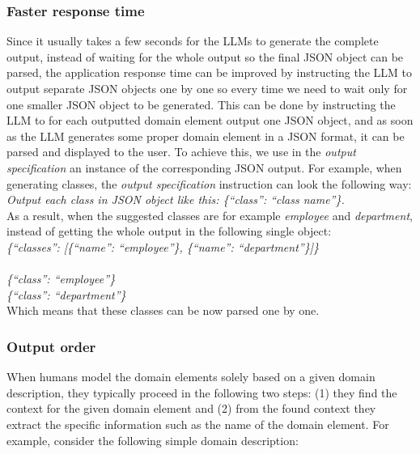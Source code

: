 \subsubsection{Faster response time}

Since it usually takes a few seconds for the LLMs to generate the complete output, instead of waiting for the whole output so the final JSON object can be parsed, the application response time can be improved by instructing the LLM to output separate JSON objects one by one so every time we need to wait only for one smaller JSON object to be generated. This can be done by instructing the LLM to for each outputted domain element output one JSON object, and as soon as the LLM generates some proper domain element in a JSON format, it can be parsed and displayed to the user. To achieve this, we use in the \emph{output specification} an instance of the corresponding JSON output. For example, when generating classes, the \emph{output specification} instruction can look the following way: \\

\noindent{}\textit{Output each class in JSON object like this: \{``class'': ``class name''\}.} \\

\noindent{}As a result, when the suggested classes are for example \textit{employee} and \textit{department}, instead of getting the whole output in the following single object: \\

\noindent{}\textit{\{``classes'': [\{``name'': ``employee''\}, \{``name'': ``department''\}]\}} \\

 \\

\noindent{}\textit{\{``class'': ``employee''\} \\
\{``class'': ``department''\}} \\

\noindent{}Which means that these classes can be now parsed one by one.


\subsubsection{Output order}
\label{sec:output_order}

When humans model the domain elements solely based on a given domain description, they typically proceed in the following two steps: (1) they find the context for the given domain element and (2) from the found context they extract the specific information such as the name of the domain element. For example, consider the following simple domain description: \\

